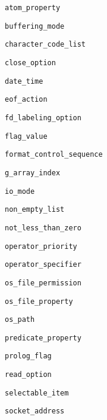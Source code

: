 \begin{ItemizeThreeCols}

\item \texttt{atom\_property}

\item \texttt{buffering\_mode}

\item \texttt{character\_code\_list}

\item \texttt{close\_option}

\item \texttt{date\_time}

\item \texttt{eof\_action}

\item \texttt{fd\_labeling\_option}

\item \texttt{flag\_value}

\item \texttt{format\_control\_sequence}

\item \texttt{g\_array\_index}

\item \texttt{io\_mode}

\item \texttt{non\_empty\_list}

\item \texttt{not\_less\_than\_zero}

\item \texttt{operator\_priority}

\item \texttt{operator\_specifier}

\item \texttt{os\_file\_permission}

\item \texttt{os\_file\_property}

\item \texttt{os\_path}

\item \texttt{predicate\_property}

\item \texttt{prolog\_flag}

\item \texttt{read\_option}

\item \texttt{selectable\_item}

\item \texttt{socket\_address}


\end{ItemizeThreeCols}
